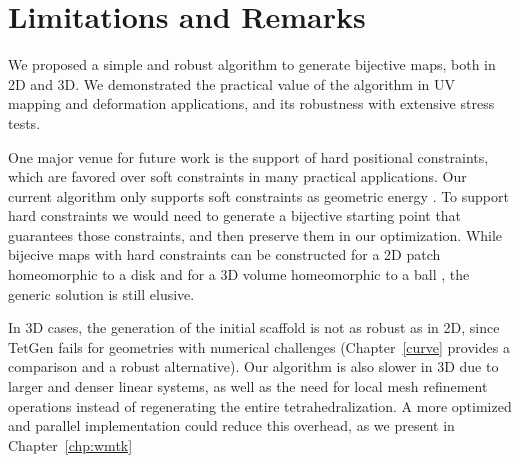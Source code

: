 \section{Limitations and Remarks}

We proposed a simple and robust algorithm to generate bijective maps, both in 2D and 3D. We demonstrated the practical value of the algorithm in UV mapping and deformation applications, and its robustness with extensive stress tests.

One major venue for future work is the support of hard positional constraints, which are favored over soft constraints in many practical applications. Our current algorithm only supports soft constraints as geometric energy \cite{Schuller:2013}. To support hard constraints we would need to generate a bijective starting point that guarantees those constraints, and then preserve them in our optimization. While bijecive maps with hard constraints can be constructed for a 2D patch homeomorphic to a disk \cite{Weber:2014:LIP} and for a 3D volume homeomorphic to a ball \cite{Campen:2016}, the generic solution is still elusive.

In 3D cases, the generation of the initial scaffold is not as robust as in 2D, since TetGen fails for geometries with numerical challenges (Chapter~\ref*{curve} provides a comparison and a robust alternative). 
Our algorithm is also slower in 3D due to larger and denser linear systems, as well as the need for local mesh refinement operations instead of regenerating the entire tetrahedralization. A more optimized and parallel implementation could reduce this overhead, as we present in Chapter~\ref*{chp:wmtk}